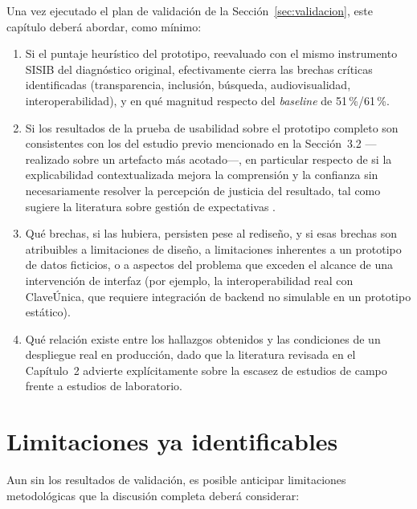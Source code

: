 Una vez ejecutado el plan de validación de la Sección~\ref{sec:validacion}, este capítulo deberá abordar, como mínimo:

\begin{enumerate}
    \item Si el puntaje heurístico del prototipo, reevaluado con el mismo instrumento SISIB del diagnóstico original, efectivamente cierra las brechas críticas identificadas (transparencia, inclusión, búsqueda, audiovisualidad, interoperabilidad), y en qué magnitud respecto del \emph{baseline} de 51\,\%/61\,\%.
    \item Si los resultados de la prueba de usabilidad sobre el prototipo completo son consistentes con los del estudio previo mencionado en la Sección~3.2 —realizado sobre un artefacto más acotado—, en particular respecto de si la explicabilidad contextualizada mejora la comprensión y la confianza sin necesariamente resolver la percepción de justicia del resultado, tal como sugiere la literatura sobre gestión de expectativas \citep{springerwhittaker2019,springerwhittaker2020}.
    \item Qué brechas, si las hubiera, persisten pese al rediseño, y si esas brechas son atribuibles a limitaciones de diseño, a limitaciones inherentes a un prototipo de datos ficticios, o a aspectos del problema que exceden el alcance de una intervención de interfaz (por ejemplo, la interoperabilidad real con ClaveÚnica, que requiere integración de backend no simulable en un prototipo estático).
    \item Qué relación existe entre los hallazgos obtenidos y las condiciones de un despliegue real en producción, dado que la literatura revisada en el Capítulo~2 advierte explícitamente sobre la escasez de estudios de campo frente a estudios de laboratorio.
\end{enumerate}

\section{Limitaciones ya identificables}

Aun sin los resultados de validación, es posible anticipar limitaciones metodológicas que la discusión completa deberá considerar:

